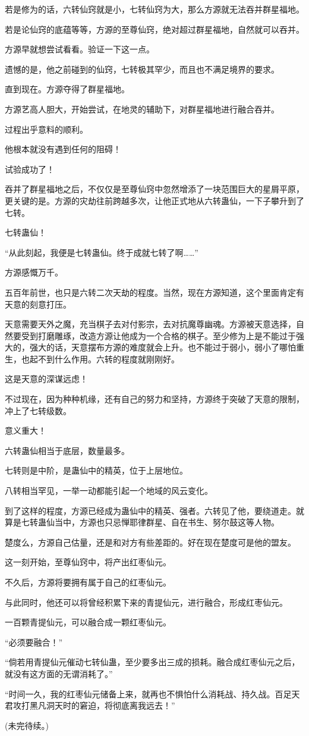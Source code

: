 \begin{this_body}
若是修为的话，六转仙窍就是小，七转仙窍为大，那么方源就无法吞并群星福地。

若是论仙窍的底蕴等等，方源的至尊仙窍，绝对超过群星福地，自然就可以吞并。

方源早就想尝试看看。验证一下这一点。

遗憾的是，他之前碰到的仙窍，七转极其罕少，而且也不满足境界的要求。

直到现在。方源夺得了群星福地。

方源艺高人胆大，开始尝试，在地灵的辅助下，对群星福地进行融合吞并。

过程出乎意料的顺利。

他根本就没有遇到任何的阻碍！

试验成功了！

吞并了群星福地之后，不仅仅是至尊仙窍中忽然增添了一块范围巨大的星屑平原，更关键的是。方源的灾劫往前跨越多次，让他正式地从六转蛊仙，一下子攀升到了七转。

七转蛊仙！

“从此刻起，我便是七转蛊仙。终于成就七转了啊……”

方源感慨万千。

五百年前世，也只是六转二次天劫的程度。当然，现在方源知道，这个里面肯定有天意的刻意打压。

天意需要天外之魔，充当棋子去对付影宗，去对抗魔尊幽魂。方源被天意选择，自然要受到打磨雕琢，改造方源让他成为一个合格的棋子。至少修为上是不能过于强大的，强大的话，天意摆布方源的难度就会上升。也不能过于弱小，弱小了哪怕重生，也起不到什么作用。六转的程度就刚刚好。

这是天意的深谋远虑！

不过现在，因为种种机缘，还有自己的努力和坚持，方源终于突破了天意的限制，冲上了七转级数。

意义重大！

六转蛊仙相当于底层，数量最多。

七转则是中阶，是蛊仙中的精英，位于上层地位。

八转相当罕见，一举一动都能引起一个地域的风云变化。

到了这样的程度，方源已经成为蛊仙中的精英、强者。六转见了他，要绕道走。就算是七转蛊仙当中，方源也只忌惮耶律群星、自在书生、努尔鼓这等人物。

楚度么，方源自己估量，还是和对方有些差距的。好在现在楚度可是他的盟友。

这一刻开始，至尊仙窍中，将产出红枣仙元。

不久后，方源将要拥有属于自己的红枣仙元。

与此同时，他还可以将曾经积累下来的青提仙元，进行融合，形成红枣仙元。

一百颗青提仙元，可以融合成一颗红枣仙元。

“必须要融合！”

“倘若用青提仙元催动七转仙蛊，至少要多出三成的损耗。融合成红枣仙元之后，就没有这方面的无谓消耗了。”

“时间一久，我的红枣仙元储备上来，就再也不惧怕什么消耗战、持久战。百足天君攻打黑凡洞天时的窘迫，将彻底离我远去！”

(未完待续。)

\end{this_body}

